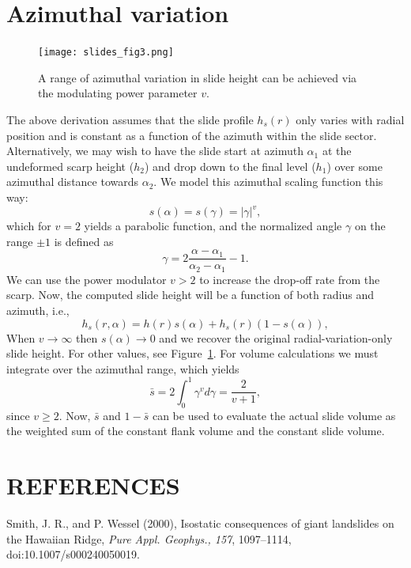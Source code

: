 \documentclass[12pt,letterpaper,margin=0.5in]{report}
\begin{document}
\section{Azimuthal variation}

\begin{figure}[h!]
  \centering
  \texttt{[image: slides\_fig3.png]}
  \caption{A range of azimuthal variation in slide height can be achieved via the modulating power parameter $v$.}
  \label{slides_fig3}
\end{figure}

The above derivation assumes that the slide profile $h_s(r)$ only varies with radial position and is constant as a function of the azimuth within the slide sector.
Alternatively, we may wish to have the slide start at azimuth $\alpha_1$ at the undeformed scarp height ($h_2$) and drop down to the final level ($h_1$)
over some azimuthal distance towards $\alpha_2$.  We model this azimuthal scaling function this way:
\begin{equation}
s(\alpha) = s(\gamma) = \left |\gamma\right|^v,
\end{equation}
which for $v = 2$ yields a parabolic function, and the normalized angle $\gamma$ on the range $\pm1$ is defined as
\begin{equation}
\gamma = 2\frac{\alpha - \alpha_1}{\alpha_2 - \alpha_1} - 1.
\end{equation}
We can use the power modulator $v > 2$ to increase the drop-off rate from the scarp. Now, the computed slide height will be a function
of both radius and azimuth, i.e.,
\begin{equation}
h_s(r, \alpha) = h(r) s(\alpha) + h_s(r) (1 - s(\alpha)),
\end{equation}
When $v \rightarrow \infty$ then $s(\alpha) \rightarrow 0$ and we recover the original radial-variation-only slide height. For other values,
see Figure~\ref{slides_fig3}.
For volume calculations we must integrate over the azimuthal range, which yields
\begin{equation}
\bar{s} = 2\int_0^1  \gamma^v d\gamma = \frac{2}{v+1},
\end{equation}
since $v \ge 2$. Now, $\bar{s}$ and $1 - \bar{s}$ can be used to evaluate the actual slide volume as the weighted sum of
the constant flank volume and the constant slide volume.

\section{REFERENCES}

Smith, J. R., and P. Wessel (2000), Isostatic consequences of giant landslides on the Hawaiian Ridge,
{\it Pure Appl. Geophys., 157}, 1097--1114, doi:10.1007/s000240050019.
\end{document}
